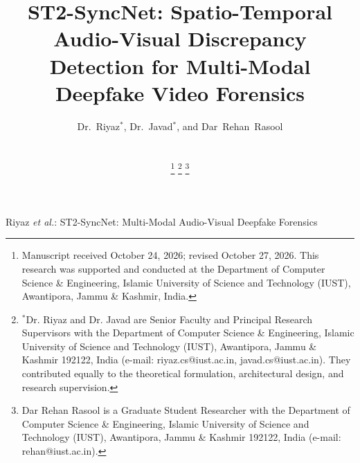 \documentclass[journal]{IEEEtran}
\begin{document}
\title{ST2-SyncNet: Spatio-Temporal Audio-Visual Discrepancy Detection for Multi-Modal Deepfake Video Forensics}

\author{
    Dr.~Riyaz$^{*}$,
    Dr.~Javad$^{*}$, and
    Dar~Rehan~Rasool\\
    \\
    \\
    \thanks{Manuscript received October 24, 2026; revised October 27, 2026. This research was supported and conducted at the Department of Computer Science \& Engineering, Islamic University of Science and Technology (IUST), Awantipora, Jammu \& Kashmir, India.}%
    \thanks{$^{*}$Dr. Riyaz and Dr. Javad are Senior Faculty and Principal Research Supervisors with the Department of Computer Science \& Engineering, Islamic University of Science and Technology (IUST), Awantipora, Jammu \& Kashmir 192122, India (e-mail: riyaz.cs@iust.ac.in, javad.cs@iust.ac.in). They contributed equally to the theoretical formulation, architectural design, and research supervision.}%
    \thanks{Dar Rehan Rasool is a Graduate Student Researcher with the Department of Computer Science \& Engineering, Islamic University of Science and Technology (IUST), Awantipora, Jammu \& Kashmir 192122, India (e-mail: rehan@iust.ac.in).}%
}

%
{Riyaz \MakeLowercase{\textit{et al.}}: ST2-SyncNet: Multi-Modal Audio-Visual Deepfake Forensics}

\maketitle
\end{document}
